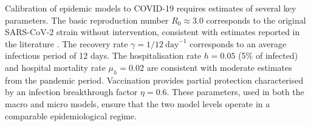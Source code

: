 Calibration of epidemic models to COVID-19 requires estimates of several key parameters.
The basic reproduction number $R_0 \approx 3.0$ corresponds to the original SARS-CoV-2 strain without intervention, consistent with estimates reported in the literature \citep{darienzo2020}.
The recovery rate $\gamma = 1/12\ \mathrm{day}^{-1}$ corresponds to an average infectious period of 12 days.
The hospitalisation rate $h = 0.05$ (5\% of infected) and hospital mortality rate $\mu_h = 0.02$ are consistent with moderate estimates from the pandemic period.
Vaccination provides partial protection characterised by an infection breakthrough factor $\eta = 0.6$.
These parameters, used in both the macro and micro models, ensure that the two model levels operate in a comparable epidemiological regime.
